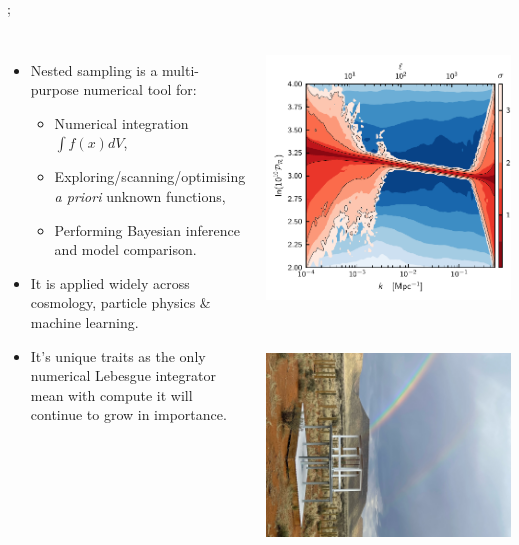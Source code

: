 \documentclass[aspectratio=169]{beamer}
\begin{document}
\begin{frame}
{    };
    \vspace{-0.1\textheight}
    \begin{columns}
    \begin{itemize}
        \item Nested sampling is a multi-purpose numerical tool for:
            \begin{itemize}
                \item Numerical integration $\int f(x) dV$,
                \item Exploring/scanning/optimising \textit{a priori} unknown functions,
                \item Performing Bayesian inference and model comparison.
            \end{itemize}
        \item It is applied widely across cosmology, particle physics \& machine learning.
        \item It's unique traits as the only numerical Lebesgue integrator mean with compute it will continue to grow in importance.
    \end{itemize}
    \includegraphics[height=0.6\textwidth]{figures/pps_both}%
    \includegraphics[height=0.6\textwidth]{figures/REACH_2}%

\end{columns}
\end{frame}
\end{document}
